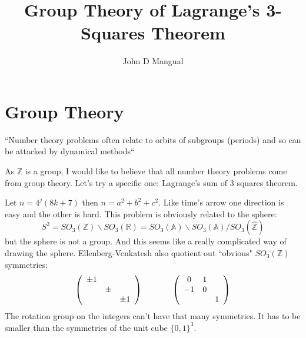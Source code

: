 \documentclass[12pt]{article}
\title{\textbf{ Group Theory of Lagrange's 3-Squares Theorem}}
\author{John D Mangual}
\date{}
\begin{document}
{ \selectfont

\maketitle

\section{  \selectfont Group Theory}

``Number theory problems often relate to orbits of subgroups (periods) and so can be 
attacked by dynamical methods`` \newline

\noindent As $\mathbb{Z}$ is a group, I would like to believe that all number theory problems come from group theory.  Let's try a specific one:  Lagrange's sum of 3 squares theorem. \newline

\noindent Let $n = 4^j (8k+7)$ then $n = a^2 + b^2 + c^2$.  Like time's arrow one direction is easy and the other is hard.  This problem is obviously related to the sphere:
$$ S^2 = SO_3(\mathbb{Z}) \backslash SO_3(\mathbb{R}) = 
SO_3(\mathbb{A}) \backslash SO_3(\mathbb{A}) / SO_3(\hat{\mathbb{Z}})$$ 
but the sphere is not a group.  And this seems like a really complicated way of drawing the sphere.  Ellenberg-Venkatesh also quotient out ``obvious" $SO_3(\mathbb{Z})$ symmetries:
$$ \left(\begin{array}{ccc} \pm 1 & & \\ & \pm  & \\ & & \pm 1 \end{array}\right) 
\hspace{0.5in}\left(\begin{array}{ccc} 0 & 1 & \\ -1 & 0  & \\ & &  1 \end{array}\right)$$
The rotation group on the integers can't have that many symmetries.  It has to be smaller than the symmetries of the unit cube $\{ 0,1 \}^3$.
\newline

}
\end{document}
